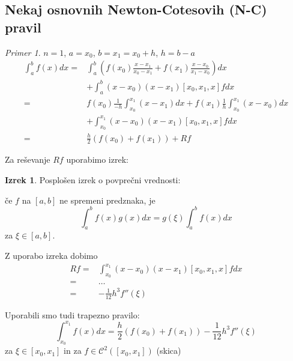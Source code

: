 \documentclass[a4paper,12pt]{article}
\theoremstyle{definition}
\newtheorem{theorem}[counter]{Izrek}
\theoremstyle{remark}
\newtheorem*{ex}{Primer}
\begin{document}
\subsection{Nekaj osnovnih Newton-Cotesovih (N-C) pravil}
\begin{ex}
    $n = 1$, $a = x_0$, $b = x_1 = x_0 + h$, $h = b-a$
    \begin{equation}
        \begin{split}
        \int_{a}^{b} f(x) dx =& \int_{a}^{b} (f(x_0) \frac{x-x_1}{x_0 - x_1} + f(x_1) \frac{x-x_0}{x_1-x_0}) dx \\
                                                              &+ \int_{a}^{b} (x-x_0)(x-x_1) [x_0, x_1, x] f dx \\
                             =& f(x_0) \frac{1}{-h} \int_{x_0}^{x_1} (x-x_1) dx + f(x_1) \frac{1}{h} \int_{x_0}^{x_1} (x-x_0) dx \\
                                                                        &+ \int_{x_0}^{x_1} (x-x_0) (x-x_1) [x_0, x_1, x] f dx \\
                             =& \frac{h}{2} (f(x_0) + f(x_1)) + Rf
        \end{split}
    \end{equation}
    
    Za reševanje $Rf$ uporabimo izrek:

    \begin{theorem}
        Posplošen izrek o povprečni vrednosti:
        
        če $f$ na $[a, b]$ ne spremeni predznaka, je
        \begin{equation*}
            \int_{a}^{b} f(x) g(x) dx = g(\xi) \int_{a}^{b} f(x) dx
        \end{equation*}
        za $\xi \in [a, b]$.
    \end{theorem}

    Z uporabo izreka dobimo
    \begin{align*}
        Rf =& \int_{x_0}^{x_1} (x-x_0)(x-x_1) [x_0, x_1, x] f dx \\
           =& \dots \\
           =& - \frac{1}{12} h^3 f''(\xi)
    \end{align*}

    Uporabili smo tudi trapezno pravilo:
    \begin{equation*}
        \int_{x_0}^{x_1} f(x) dx = \frac{h}{2} (f(x_0) + f(x_1)) - \frac{1}{12} h^3 f''(\xi)
    \end{equation*}
    za $\xi \in [x_0, x_1]$ in za $f \in \mathscr{C}^2([x_0, x_1])$
    (skica)



\end{ex}
\end{document}
